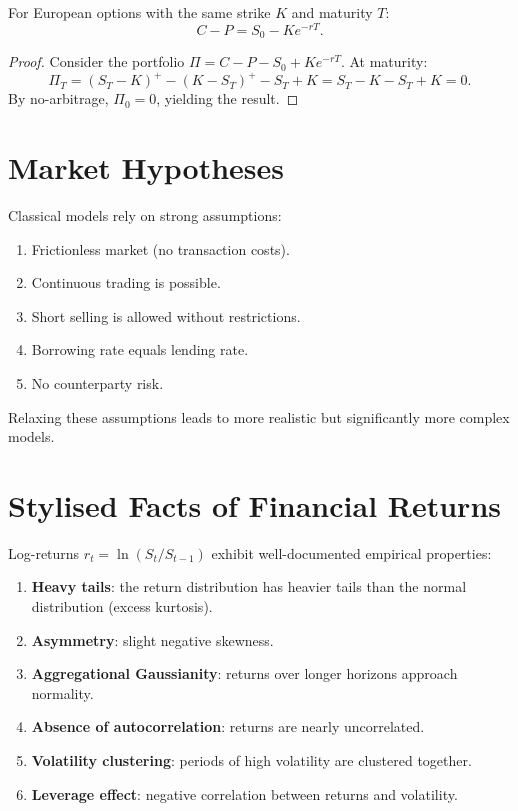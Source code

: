 \begin{theorem}
For European options with the same strike $K$ and maturity $T$:
\[
    C - P = S_0 - K e^{-rT}.
\]
\end{theorem}

\begin{proof}
Consider the portfolio $\Pi = C - P - S_0 + Ke^{-rT}$. At maturity:
\[
    \Pi_T = (S_T - K)^+ - (K - S_T)^+ - S_T + K = S_T - K - S_T + K = 0.
\]
By no-arbitrage, $\Pi_0 = 0$, yielding the result.
\end{proof}

\section{Market Hypotheses}

\begin{warning}[title=\textbf{Simplifying Assumptions}]
Classical models rely on strong assumptions:
\begin{enumerate}
    \item Frictionless market (no transaction costs).
    \item Continuous trading is possible.
    \item Short selling is allowed without restrictions.
    \item Borrowing rate equals lending rate.
    \item No counterparty risk.
\end{enumerate}
Relaxing these assumptions leads to more realistic but significantly
more complex models.
\end{warning}

\section{Stylised Facts of Financial Returns}

Log-returns $r_t = \ln(S_t/S_{t-1})$ exhibit well-documented empirical
properties:

\begin{enumerate}
    \item \textbf{Heavy tails}: the return distribution has heavier tails
          than the normal distribution (excess kurtosis).
    \item \textbf{Asymmetry}: slight negative skewness.
    \item \textbf{Aggregational Gaussianity}: returns over longer horizons
          approach normality.
    \item \textbf{Absence of autocorrelation}: returns are nearly uncorrelated.
    \item \textbf{Volatility clustering}: periods of high volatility are
          clustered together.
    \item \textbf{Leverage effect}: negative correlation between returns
          and volatility.
\end{enumerate}

